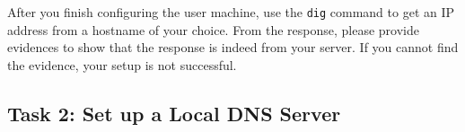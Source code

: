 After you finish configuring the user machine, use the \texttt{dig} command
to get an IP address from a hostname of your choice. From the response, please provide
evidences to show that the response is indeed from your server. If you cannot find the
evidence, your setup is not successful. 


\begin{comment}
To avoid this, we should tell the DHCP client not to set the
DNS server automatically. This can be achieved using the following procedure (for \ubuntu
16.04):


\begin{enumerate}
  \item Go to \texttt{"System Settings"}, and click the \texttt{"Network"} icon.
  \item Choose the \texttt{"Wired"} tab, and click the
        \texttt{"Options"} button. A dialog will pop up.

  \item Click the \texttt{ "IPv4 Settings"} tab.  In the \texttt{"Method"} entry, choose
        \texttt{"Automatic (DHCP) Addresses Only"}, and then type the IP address of the local DNS
        server in the \texttt{"DNS servers"} entry. We do not need to type anything in the
        other two fields~(See Figure~\ref{dns:fig:user_machine_setup}).

  \item Finally, click the network icon on the top right corner of the desktop, and Select
    \texttt{"Wired connection 1"}. This will refresh the wired network connection and updates the changes.
    It should be noted that \texttt{"Wired connection 1"} is the name that we choose for our
    connection (see Figure~\ref{dns:fig:user_machine_setup});  we can choose a
    different name.
\end{enumerate}


\begin{figure}[htb]
  \begin{center}
    \texttt{[image: \\dnsFigs/config\_local\_dns\_server.pdf]}
  \end{center}
  \caption{User machine setup}
  \label{dns:fig:user_machine_setup}
\end{figure}

\end{comment}


\subsection{Task 2: Set up a Local DNS Server}

